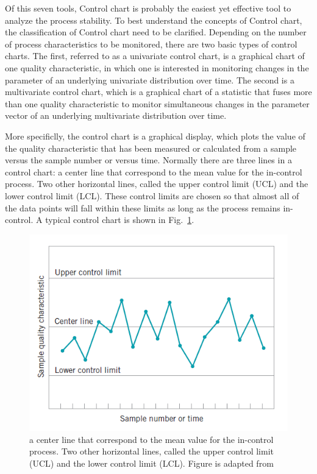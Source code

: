 Of this seven tools, Control chart is probably the easiest yet effective tool to analyze the process stability. To best understand the concepts of Control chart, the classification of Control chart need to be clarified. Depending on the number of process characteristics to be monitored, there are two basic types of control charts. The first, referred to as a univariate control chart, is a graphical chart of one quality characteristic, in which one is interested in monitoring changes in the parameter of an underlying univariate distribution
over time. The second is a multivariate control chart, which is a graphical chart of a statistic that fuses more than one quality characteristic to monitor simultaneous changes in the parameter
vector of an underlying multivariate distribution over time.


More specificlly, the control chart is a graphical display, which plots the value of the quality characteristic that has been measured or calculated from a sample versus the sample number or versus time. Normally there are three lines in a control chart: a center line that correspond to the mean value for the in-control process. Two other horizontal lines, called the upper control limit (UCL) and the lower control limit (LCL). These control limits are chosen so that almost all of the data points will fall within these limits as long as the process remains in-control. A typical control chart is shown in Fig.~\ref{fig:control_chart}.

\begin{figure}[h]
\centering
\includegraphics[width=1\textwidth]{images/control_chart.PNG}
\caption[A typical control chart.]{a center line that correspond to the mean value for the in-control process. Two other horizontal lines, called the upper control limit (UCL) and the lower control limit (LCL). Figure is adapted from ~\cite{montgomery2020introduction}}
\label{fig:control_chart}
\end{figure}

